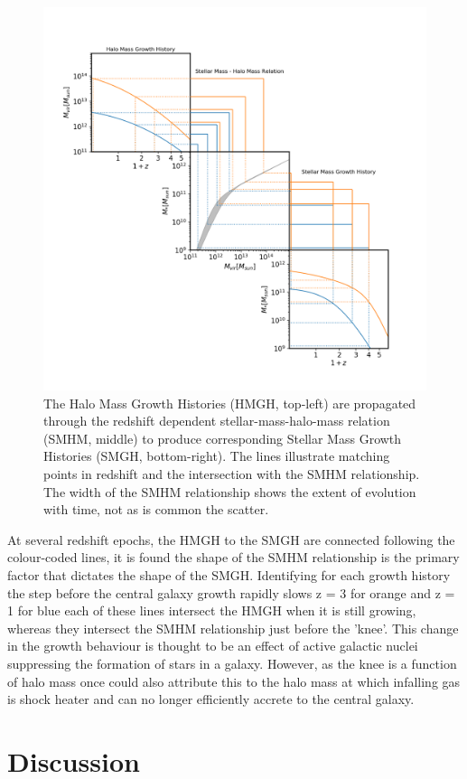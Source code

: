 \begin{figure}[h]
    \centering
    \includegraphics[width = \linewidth]{Figures/Chapter2/HMGH_to_SMGH.png}
    \caption{The Halo Mass Growth Histories (HMGH, top-left) are propagated through the redshift dependent stellar-mass-halo-mass relation (SMHM, middle) to produce corresponding Stellar Mass Growth Histories (SMGH, bottom-right). The lines illustrate matching points in redshift and the intersection with the SMHM relationship. The width of the SMHM relationship shows the extent of evolution with time, not as is common the scatter.}
    \label{fig:Cent_Mass_PP}
\end{figure}

At several redshift epochs, the HMGH to the SMGH are connected following the colour-coded lines, it is found the shape of the SMHM relationship is the primary factor that dictates the shape of the SMGH. Identifying for each growth history the step before the central galaxy growth rapidly slows z = 3 for orange and z = 1 for blue each of these lines intersect the HMGH when it is still growing, whereas they intersect the SMHM relationship just before the 'knee'. This change in the growth behaviour is thought to be an effect of active galactic nuclei suppressing the formation of stars in a galaxy. However, as the knee is a function of halo mass once could also attribute this to the halo mass at which infalling gas is shock heater and can no longer efficiently accrete to the central galaxy.

\section{Discussion}

